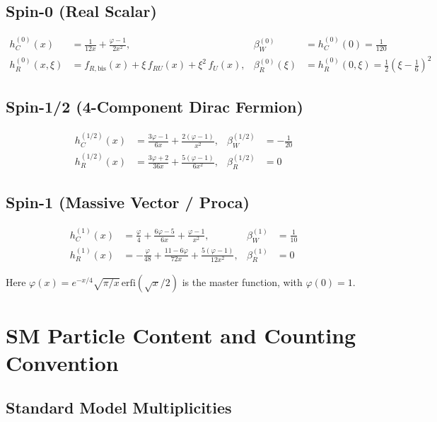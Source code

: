 \documentclass[11pt,a4paper]{article}
\begin{document}
\subsection{Spin-0 (Real Scalar)}

\begin{align}
  h_C^{(0)}(x) &= \frac{1}{12x} + \frac{\varphi - 1}{2x^2}, &
  \beta_W^{(0)} &= h_C^{(0)}(0) = \frac{1}{120} \\
  h_R^{(0)}(x,\xi) &= f_{R,\mathrm{bis}}(x) + \xi\,f_{RU}(x) + \xi^2\,f_U(x), &
  \beta_R^{(0)}(\xi) &= h_R^{(0)}(0,\xi) = \frac{1}{2}\!\left(\xi - \frac{1}{6}\right)^{\!2}
\end{align}

\subsection{Spin-1/2 (4-Component Dirac Fermion)}

\begin{align}
  h_C^{(1/2)}(x) &= \frac{3\varphi - 1}{6x} + \frac{2(\varphi - 1)}{x^2}, &
  \beta_W^{(1/2)} &= -\frac{1}{20} \\
  h_R^{(1/2)}(x) &= \frac{3\varphi + 2}{36x} + \frac{5(\varphi - 1)}{6x^2}, &
  \beta_R^{(1/2)} &= 0
\end{align}

\subsection{Spin-1 (Massive Vector / Proca)}

\begin{align}
  h_C^{(1)}(x) &= \frac{\varphi}{4} + \frac{6\varphi - 5}{6x} + \frac{\varphi - 1}{x^2}, &
  \beta_W^{(1)} &= \frac{1}{10} \\
  h_R^{(1)}(x) &= -\frac{\varphi}{48} + \frac{11 - 6\varphi}{72x} + \frac{5(\varphi - 1)}{12x^2}, &
  \beta_R^{(1)} &= 0
\end{align}

Here $\varphi(x) = e^{-x/4}\sqrt{\pi/x}\,\mathrm{erfi}(\sqrt{x}/2)$
is the master function, with $\varphi(0) = 1$.

\section{SM Particle Content and Counting Convention}

\subsection{Standard Model Multiplicities}
\end{document}
